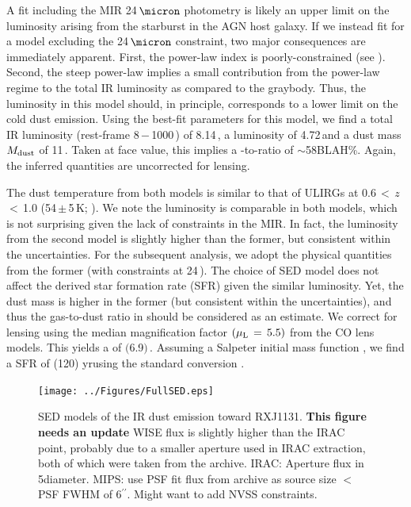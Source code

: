 \documentclass[]{emulateapj}
\begin{document}
A fit including the MIR 24\,$\micron$ photometry
is likely an upper limit on the \fir luminosity arising from the starburst
in the AGN host galaxy.
If we instead fit for a model excluding the 24\,$\micron$ constraint,
two major consequences are immediately apparent.
First, the power-law index is poorly-constrained (see ).
Second, the steep power-law implies a small contribution
from the power-law regime
to the total IR luminosity as compared to the graybody.
Thus, the \fir luminosity in
this model should, in principle, corresponds to a
lower limit on the cold dust emission.
Using the best-fit parameters
for this model, we find a total IR luminosity
\LIR (rest-frame 8\,$-$\,1000\,\micron) of 8.14\,\Lsun,
a \fir luminosity \LFIR of 4.72\,\Lsun and a
dust mass $M_{\rm dust}$ of 11\,\Msun.
Taken at face value, this implies a \LFIR-to-\LIR ratio
of $\sim$58\pmm BLAH\%.
Again, the inferred quantities are uncorrected for lensing.

The dust temperature from both models is similar to that of
ULIRGs at 0.6\,$<$\,$z$\,$<$\,1.0 (54\,$\pm$\,5\,K; \citealt[hereafter C13]{Combes13a}).
We note the \fir luminosity is comparable in both models, which is
not surprising given the lack of constraints in the MIR. In fact, the
\fir luminosity from the second model is slightly higher than the former, but
consistent within the uncertainties.
For the subsequent analysis, we adopt the physical quantities
from the former (\ie with constraints at 24\,\micron).
The choice of SED model does not affect
the derived star formation rate (SFR) given the similar \fir luminosity.
Yet, the dust mass is higher in the former (but consistent within the
uncertainties), and thus the gas-to-dust ratio in 
should be considered as an estimate.
We correct for lensing using the median magnification
factor $(\mu_{\rm L}\,=\,5.5)$
from the CO lens models. This yields a \LFIR of $($6.9$)$\,\Lsun.
Assuming a Salpeter initial
mass function \citep{Salpeter55a}, we find a
SFR of (120)\,\Msun\,yr\pmOne using the
standard conversion \citep{Kennicutt98a}.

\begin{figure}[!htbp]
\centering
\texttt{[image: ../Figures/FullSED.eps]}
\caption{SED models of the IR dust emission toward RXJ1131.
{\bf This figure needs an update}
WISE flux is slightly higher than the IRAC point, probably due to a smaller
aperture used in IRAC extraction,
both of which were taken from the archive.
IRAC: Aperture flux in 5\farcs diameter.
MIPS: use PSF fit flux from archive as source size $<$ PSF FWHM of 6$^{\prime\prime}$.
Might want to add NVSS constraints.
\label{fig:SED}}
\end{figure}
\end{document}
